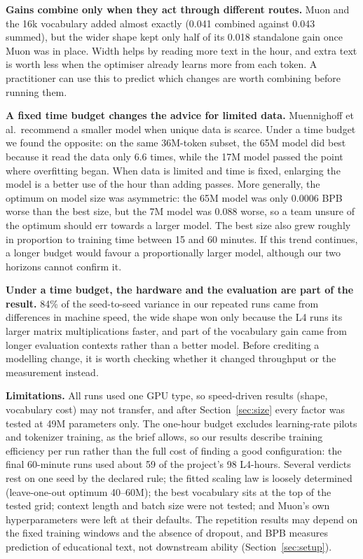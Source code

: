 \documentclass[11pt,a4paper]{article}
\begin{document}
\textbf{Gains combine only when they act through different routes.} Muon and the 16k vocabulary added almost exactly (0.041 combined against 0.043 summed), but the wider shape kept only half of its 0.018 standalone gain once Muon was in place. Width helps by reading more text in the hour, and extra text is worth less when the optimiser already learns more from each token. A practitioner can use this to predict which changes are worth combining before running them.

\textbf{A fixed time budget changes the advice for limited data.} Muennighoff et al.\ recommend a smaller model when unique data is scarce. Under a time budget we found the opposite: on the same 36M-token subset, the 65M model did best because it read the data only 6.6 times, while the 17M model passed the point where overfitting began. When data is limited and time is fixed, enlarging the model is a better use of the hour than adding passes. More generally, the optimum on model size was asymmetric: the 65M model was only 0.0006 BPB worse than the best size, but the 7M model was 0.088 worse, so a team unsure of the optimum should err towards a larger model. The best size also grew roughly in proportion to training time between 15 and 60 minutes. If this trend continues, a longer budget would favour a proportionally larger model, although our two horizons cannot confirm it.

\textbf{Under a time budget, the hardware and the evaluation are part of the result.} 84\% of the seed-to-seed variance in our repeated runs came from differences in machine speed, the wide shape won only because the L4 runs its larger matrix multiplications faster, and part of the vocabulary gain came from longer evaluation contexts rather than a better model. Before crediting a modelling change, it is worth checking whether it changed throughput or the measurement instead.

\textbf{Limitations.} All runs used one GPU type, so speed-driven results (shape, vocabulary cost) may not transfer, and after Section~\ref{sec:size} every factor was tested at 49M parameters only. The one-hour budget excludes learning-rate pilots and tokenizer training, as the brief allows, so our results describe training efficiency per run rather than the full cost of finding a good configuration: the final 60-minute runs used about 59 of the project's 98 L4-hours. Several verdicts rest on one seed by the declared rule; the fitted scaling law is loosely determined (leave-one-out optimum 40--60M); the best vocabulary sits at the top of the tested grid; context length and batch size were not tested; and Muon's own hyperparameters were left at their defaults. The repetition results may depend on the fixed training windows and the absence of dropout, and BPB measures prediction of educational text, not downstream ability (Section~\ref{sec:setup}).
\end{document}
